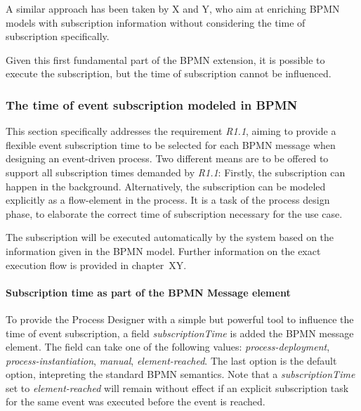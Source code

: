 A similar approach has been taken by X and Y, who aim at enriching BPMN models with subscription information without considering the time of subscription specifically.

Given this first fundamental part of the BPMN extension, it is possible to execute the subscription, but the time of subscription cannot be influenced.

\subsubsection*{The time of event subscription modeled in BPMN}\label{ch:bpmnx:subscriptiontimes}

This section specifically addresses the requirement \textit{R1.1}, aiming to provide a flexible event subscription time to be selected for each BPMN message when designing an event-driven process.
Two different means are to be offered to support all subscription times demanded by \textit{R1.1}: Firstly, the subscription can happen in the background. Alternatively, the subscription can be modeled explicitly as a flow-element in the process.
It is a task of the process design phase, to elaborate the correct time of subscription necessary for the use case.

The subscription will be executed automatically by the system based on the information given in the BPMN model. Further information on the exact execution flow is provided in chapter~XY.


\paragraph{Subscription time as part of the BPMN Message element\newline}
To provide the Process Designer with a simple but powerful tool to influence the time of event subscription, a field \textit{subscriptionTime} is added the BPMN message element. 
The field can take one of the following values: \textit{process-deployment}, \textit{process-instantiation}, \textit{manual}, \textit{element-reached}. The last option is the default option, intepreting the standard BPMN semantics.
Note that a \textit{subscriptionTime} set to \textit{element-reached} will remain without effect if an explicit subscription task for the same event was executed before the event is reached.


